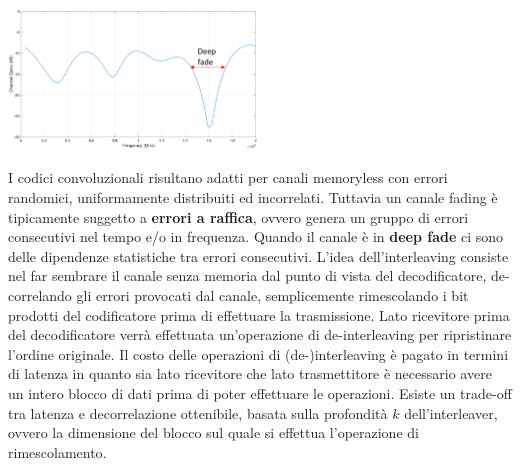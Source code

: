 \begin{center}
\end{center}
\begin{center}
    \includegraphics[width=0.5\textwidth]{imgs/deep_fade.png}
\end{center}

I codici convoluzionali risultano adatti per canali memoryless con errori randomici, uniformamente distribuiti ed incorrelati. 
Tuttavia un canale fading è tipicamente suggetto a \textbf{errori a raffica}, ovvero genera un gruppo di errori consecutivi nel tempo e/o in frequenza. 
Quando il canale è in \textbf{deep fade} ci sono delle dipendenze statistiche tra errori consecutivi.
L'idea dell'interleaving consiste nel far sembrare il canale senza memoria dal punto di vista del decodificatore, de-correlando gli errori provocati dal canale, semplicemente rimescolando i bit prodotti del codificatore prima di effettuare la trasmissione.
Lato ricevitore prima del decodificatore verrà effettuata un'operazione di de-interleaving per ripristinare l'ordine originale.
Il costo delle operazioni di (de-)interleaving è pagato in termini di latenza in quanto sia lato ricevitore che lato trasmettitore è necessario avere un intero blocco di dati prima di poter effettuare le operazioni. 
Esiste un trade-off tra latenza e decorrelazione ottenibile, basata sulla profondità $k$ dell'interleaver, ovvero la dimensione del blocco sul quale si effettua l'operazione di rimescolamento.

